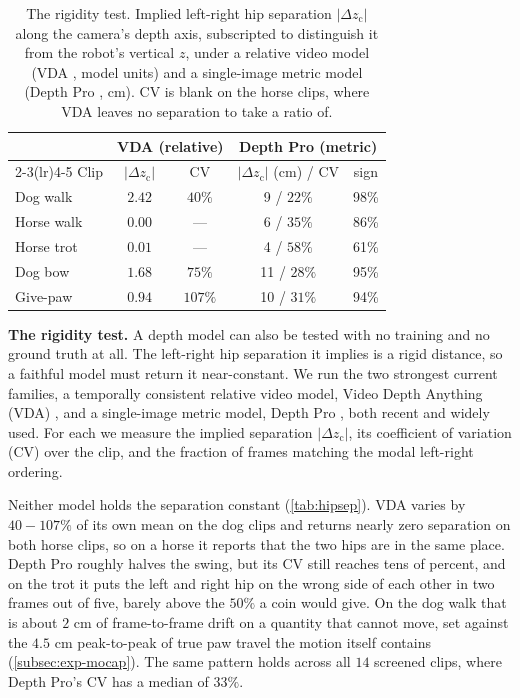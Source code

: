 \documentclass[letterpaper, 10 pt, conference]{ieeeconf}
\begin{document}
\begin{table}[t]
\centering
\setlength{\tabcolsep}{2.2pt}
\caption{The rigidity test. Implied left-right hip separation $|\Delta z_{\mathrm{c}}|$ along the camera's depth axis, subscripted to distinguish it from the robot's vertical $z$, under a relative video model (VDA \cite{chen2025videodepth}, model units) and a single-image metric model (Depth Pro \cite{bochkovskii2025depthpro}, cm). CV is blank on the horse clips, where VDA leaves no separation to take a ratio of.
}
\label{tab:hipsep}
\begin{tabular*}{\linewidth}{@{\extracolsep{\fill}}lcccc@{}}
\toprule
& \multicolumn{2}{c}{VDA (relative)} & \multicolumn{2}{c}{Depth Pro (metric)} \\
\cmidrule(lr){2-3}\cmidrule(lr){4-5}
Clip & $|\Delta z_{\mathrm{c}}|$ & CV & $|\Delta z_{\mathrm{c}}|$ (cm) / CV & sign \\
\midrule
Dog walk   & $2.42$ & $40\%$  & 9 / $22\%$  & 98\% \\
Horse walk & $0.00$ & ---     & 6 / $35\%$  & 86\% \\
Horse trot & $0.01$ & ---     & 4 / $58\%$  & 61\% \\
Dog bow    & $1.68$ & $75\%$  & 11 / $28\%$ & 95\% \\
Give-paw   & $0.94$ & $107\%$ & 10 / $31\%$ & 94\% \\
\bottomrule
\end{tabular*}
\end{table}

\textbf{The rigidity test.} 
A depth model can also be tested with no training and no ground truth at all. The left-right hip separation it implies is a rigid distance, so a faithful model must return it near-constant. We run the two strongest current families, a temporally consistent relative video model, Video Depth Anything (VDA) \cite{chen2025videodepth}, and a single-image metric model, Depth Pro \cite{bochkovskii2025depthpro}, both recent and widely used. For each we measure the implied separation $|\Delta z_{\mathrm{c}}|$, its coefficient of variation (CV) over the clip, and the fraction of frames matching the modal left-right ordering.

 
Neither model holds the separation constant (\autoref{tab:hipsep}).
VDA varies by $40-107\%$ of its own mean on the dog clips and returns nearly zero separation on both horse clips, so on a horse it reports that the two hips are in the same place. Depth Pro roughly halves the swing, but its CV still reaches tens of percent, and on the trot it puts the left and right hip on the wrong side of each other in two frames out of five, barely above the $50\%$ a coin would give. On the dog walk that is about $2$ cm of frame-to-frame drift on a quantity that cannot move, set against the $4.5$ cm peak-to-peak of true paw travel the motion itself contains (\autoref{subsec:exp-mocap}). The same pattern holds across all $14$ screened clips, where Depth Pro's CV has a median of $33\%$.
\end{document}
